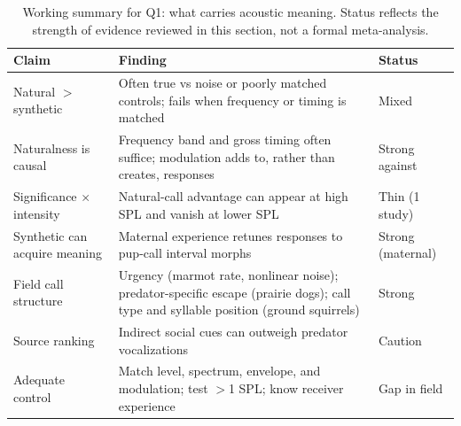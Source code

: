\begin{table}[tbp]
\centering
\footnotesize
\singlespacing
\caption{Working summary for Q1: what carries acoustic meaning. Status reflects the strength of evidence reviewed in this section, not a formal meta-analysis.}
\label{tab:summary-q1}
\begin{tabular}{@{}p{1.55in}p{3.7in}p{1.0in}@{}}
\toprule
\textbf{Claim} & \textbf{Finding} & \textbf{Status} \\
\midrule
Natural $>$ synthetic & Often true vs noise or poorly matched controls; fails when frequency or timing is matched & Mixed \\
\addlinespace[2pt]
Naturalness is causal & Frequency band and gross timing often suffice; modulation adds to, rather than creates, responses & Strong against \\
\addlinespace[2pt]
Significance $\times$ intensity & Natural-call advantage can appear at high SPL and vanish at lower SPL & Thin (1 study) \\
\addlinespace[2pt]
Synthetic can acquire meaning & Maternal experience retunes responses to pup-call interval morphs & Strong (maternal) \\
\addlinespace[2pt]
Field call structure & Urgency (marmot rate, nonlinear noise); predator-specific escape (prairie dogs); call type and syllable position (ground squirrels) & Strong \\
\addlinespace[2pt]
Source ranking & Indirect social cues can outweigh predator vocalizations & Caution \\
\addlinespace[2pt]
Adequate control & Match level, spectrum, envelope, and modulation; test $>$1 SPL; know receiver experience & Gap in field \\
\bottomrule
\end{tabular}
\end{table}
